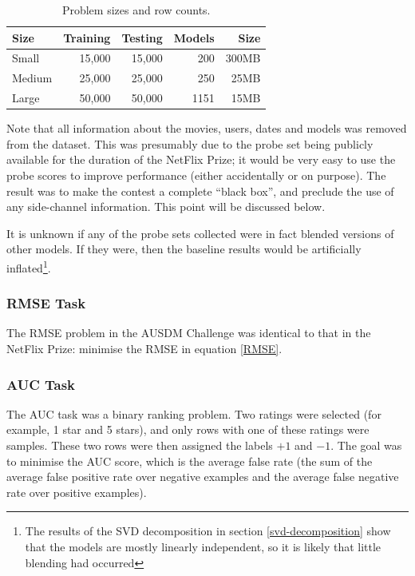 \documentclass{article}
\begin{document}
\begin{table}[t]
\caption{Problem sizes and row counts.}
\label{problems}
\vskip 0.15in
\begin{center}
\begin{small}
\begin{sc}
\begin{tabular}{lrrrr}
\hline
\abovespace\belowspace
Size & Training & Testing & Models & Size \\
\hline
\abovespace
Small    & 15,000 & 15,000 & 200 & 300MB \\
Medium   & 25,000 & 25,000 & 250 &  25MB \\
\belowspace
Large    & 50,000 & 50,000 & 1151 & 15MB \\
\hline
\end{tabular}
\end{sc}
\end{small}
\end{center}
\vskip -0.1in
\end{table}

Note that all information about the movies, users, dates and models was removed from the dataset.  This was presumably due to the probe set being publicly available for the duration of the NetFlix Prize; it would be very easy to use the probe scores to improve performance (either accidentally or on purpose).  The result was to make the contest a complete ``black box'', and preclude the use of any side-channel information.  This point will be discussed below.

It is unknown if any of the probe sets collected were in fact blended versions of other models.  If they were, then the baseline results would be artificially inflated\footnote{The results of the SVD decomposition in section \ref{svd-decomposition} show that the models are mostly linearly independent, so it is likely that little blending had occurred}.

\subsubsection{RMSE Task}

The RMSE problem in the AUSDM Challenge was identical to that in the NetFlix Prize: minimise the RMSE in equation \ref{RMSE}.

\subsubsection{AUC Task}

The AUC task was a binary ranking problem.  Two ratings were selected (for example, 1 star and 5 stars), and only rows with one of these ratings were samples.  These two rows were then assigned the labels $+1$ and $-1$.  The goal was to minimise the AUC score, which is the average false rate (the sum of the average false positive rate over negative examples and the average false negative rate over positive examples).
\end{document}

